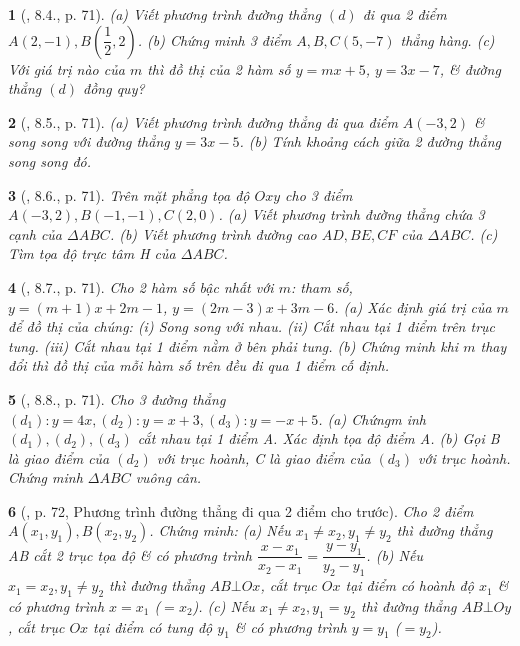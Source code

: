 \documentclass{article}
\newtheorem{baitoan}{}
\begin{document}
\begin{baitoan}[\cite{Binh_boi_duong_Toan_9_tap_1}, 8.4., p. 71]
	(a) Viết phương trình đường thẳng $(d)$ đi qua 2 điểm $A(2,-1),B\left(\dfrac{1}{2},2\right)$. (b) Chứng minh 3 điểm $A,B,C(5,-7)$ thẳng hàng. (c) Với giá trị nào của $m$ thì đồ thị của 2 hàm số $y = mx + 5$, $y = 3x - 7$, \& đường thẳng $(d)$ đồng quy?
\end{baitoan}

\begin{baitoan}[\cite{Binh_boi_duong_Toan_9_tap_1}, 8.5., p. 71]
	(a) Viết phương trình đường thẳng đi qua điểm $A(-3,2)$ \& song song với đường thẳng $y = 3x - 5$. (b) Tính khoảng cách giữa 2 đường thẳng song song đó.
\end{baitoan}

\begin{baitoan}[\cite{Binh_boi_duong_Toan_9_tap_1}, 8.6., p. 71]
	Trên mặt phẳng tọa độ $Oxy$ cho 3 điểm $A(-3,2),B(-1,-1),C(2,0)$. (a) Viết phương trình đường thẳng chứa 3 cạnh của $\Delta ABC$. (b) Viết phương trình đường cao $AD,BE,CF$ của $\Delta ABC$. (c) Tìm tọa độ trực tâm H của $\Delta ABC$.
\end{baitoan}

\begin{baitoan}[\cite{Binh_boi_duong_Toan_9_tap_1}, 8.7., p. 71]
	Cho 2 hàm số bậc nhất với $m$: tham số, $y = (m + 1)x + 2m - 1$, $y = (2m - 3)x + 3m - 6$. (a) Xác định giá trị của $m$ để đồ thị của chúng: (i) Song song với nhau. (ii) Cắt nhau tại 1 điểm trên trục tung. (iii) Cắt nhau tại 1 điểm nằm ở bên phải tung. (b) Chứng minh khi $m$ thay đổi thì đồ thị của mỗi hàm số trên đều đi qua 1 điểm cố định.
\end{baitoan}

\begin{baitoan}[\cite{Binh_boi_duong_Toan_9_tap_1}, 8.8., p. 71]
	Cho 3 đường thẳng $(d_1):y = 4x,(d_2):y = x + 3,(d_3):y = -x + 5$. (a) Chứngm inh $(d_1),(d_2),(d_3)$ cắt nhau tại 1 điểm A. Xác định tọa độ điểm A. (b) Gọi B là giao điểm của $(d_2)$ với trục hoành, C là giao điểm của $(d_3)$ với trục hoành. Chứng minh $\Delta ABC$ vuông cân.
\end{baitoan}

\begin{baitoan}[\cite{Binh_boi_duong_Toan_9_tap_1}, p. 72, Phương trình đường thẳng đi qua 2 điểm cho trước]
	Cho 2 điểm $A(x_1,y_1),B(x_2,y_2)$. Chứng minh: (a) Nếu $x_1\ne x_2,y_1\ne y_2$ thì đường thẳng AB cắt 2 trục tọa độ \& có phương trình $\dfrac{x - x_1}{x_2 - x_1} = \dfrac{y - y_1}{y_2 - y_1}$. (b) Nếu $x_1 = x_2,y_1\ne y_2$ thì đường thẳng $AB\bot Ox$, cắt trục $Ox$ tại điểm có hoành độ $x_1$ \& có phương trình $x = x_1$ ($= x_2$). (c) Nếu $x_1\ne x_2,y_1 = y_2$ thì đường thẳng $AB\bot Oy$, cắt trục $Ox$ tại điểm có tung độ $y_1$ \& có phương trình $y = y_1$ ($= y_2$).
\end{baitoan}
\end{document}
